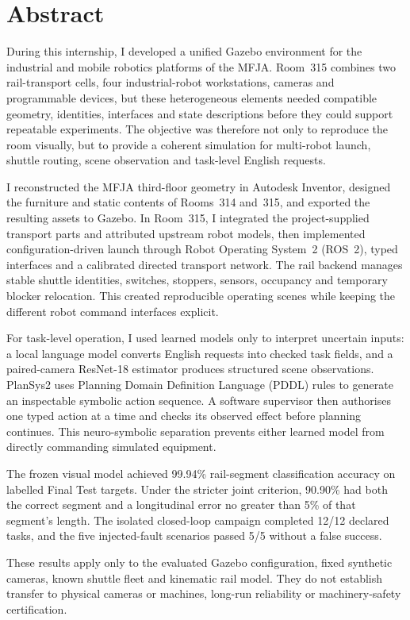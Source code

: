 \cleardoublepage
\chapter*{Abstract}
During this internship, I developed a unified Gazebo environment for the
industrial and mobile robotics platforms of the MFJA. Room~315 combines two
rail-transport cells, four industrial-robot workstations, cameras and
programmable devices, but these heterogeneous elements needed compatible
geometry, identities, interfaces and state descriptions before they could
support repeatable experiments. The objective was therefore not only to
reproduce the room visually, but to provide a coherent simulation for
multi-robot launch, shuttle routing, scene observation and task-level English
requests.

I reconstructed the MFJA third-floor geometry in Autodesk Inventor, designed
the furniture and static contents of Rooms~314 and~315, and exported the
resulting assets to Gazebo. In Room~315, I integrated the project-supplied
transport parts and attributed upstream robot models, then implemented
configuration-driven launch through Robot Operating System~2 (ROS~2), typed
interfaces and a calibrated directed transport network. The rail backend manages
stable shuttle identities, switches, stoppers, sensors, occupancy and temporary
blocker relocation. This created reproducible operating scenes while keeping the
different robot command interfaces explicit.

For task-level operation, I used learned models only to interpret uncertain
inputs: a local language model converts English requests into checked task
fields, and a paired-camera ResNet-18 estimator produces structured scene
observations. PlanSys2 uses Planning Domain Definition Language (PDDL) rules to
generate an inspectable symbolic action sequence. A software supervisor then
authorises one typed action at a time and checks its observed effect before
planning continues. This neuro-symbolic separation prevents either learned
model from directly commanding simulated equipment.

The frozen visual model achieved 99.94\% rail-segment classification accuracy
on labelled Final Test targets. Under the stricter joint criterion, 90.90\% had
both the correct segment and a longitudinal error no greater than 5\% of that
segment's length. The isolated closed-loop campaign completed 12/12 declared
tasks, and the five injected-fault scenarios passed 5/5 without a false success.

These results apply only to the evaluated Gazebo configuration, fixed synthetic
cameras, known shuttle fleet and kinematic rail model. They do not establish
transfer to physical cameras or machines, long-run reliability or
machinery-safety certification.


